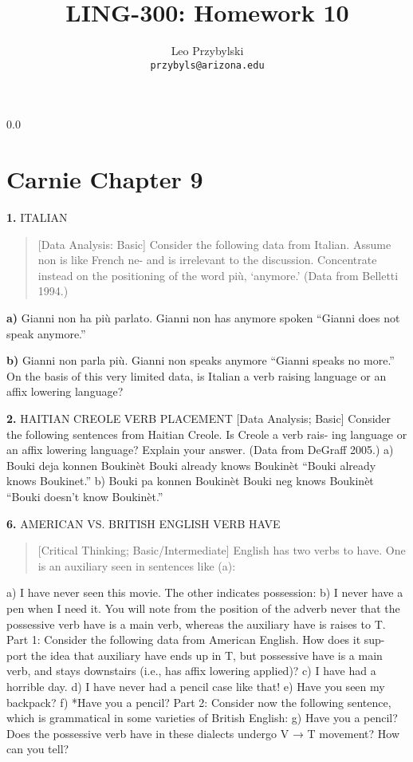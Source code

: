 \documentclass[11pt,notitlepage]{article}
\title{LING-300: Homework 10}
\author{Leo Przybylski\\
\texttt{przybyls@arizona.edu}}
\newcommand{\question}[2]{\textbf{#1.} #2}
\newcommand{\subquestion}[2]{\par\hspace{0.5cm} \textbf{#1)} #2}
\begin{document}
  \maketitle
  {\setlength{\baselineskip}%
           {0.0\baselineskip}
  \section*{Carnie Chapter 9}
  \hrulefill \par}

\question{1}{ITALIAN}
\begin{quote}
[Data Analysis: Basic]
Consider the following data from Italian. Assume non is like French
ne- and is irrelevant to the discussion. Concentrate instead on the
positioning of the word più, ‘anymore.’ (Data from Belletti 1994.)
\end{quote}
\subquestion{a}{Gianni non ha più parlato.}
Gianni non has anymore spoken “Gianni does not speak anymore.”

\subquestion{b}{Gianni non parla più.}
Gianni non speaks anymore “Gianni speaks no more.”
On the basis of this very limited data, is Italian a verb raising
language or an affix lowering language?

\question{2}{HAITIAN CREOLE VERB PLACEMENT}
[Data Analysis; Basic]
Consider the following sentences from Haitian Creole. Is Creole a verb rais- ing language or an affix lowering language? Explain your answer. (Data from DeGraff 2005.)
a) Bouki deja konnen Boukinèt Bouki already knows Boukinèt “Bouki already knows Boukinet.”
b) Bouki pa konnen Boukinèt Bouki neg knows Boukinèt “Bouki doesn’t
know Boukinèt.”

\question{6}{AMERICAN VS. BRITISH ENGLISH VERB HAVE}
\begin{quote}
[Critical Thinking; Basic/Intermediate]
English has two verbs to have. One is an auxiliary seen in sentences
like (a):
\end{quote}

a) I have never seen this movie.
The other indicates possession:
b) I never have a pen when I need it.
You will note from the position of the adverb never that the possessive verb have is a main verb, whereas the auxiliary have is raises to T.
Part 1: Consider the following data from American English. How does it sup- port the idea that auxiliary have ends up in T, but possessive have is a main verb, and stays downstairs (i.e., has affix lowering applied)?
c) I have had a horrible day.
d) I have never had a pencil case like that!
e) Have you seen my backpack?
f) *Have you a pencil?
Part 2: Consider now the following sentence, which is grammatical in some varieties of British English:
g) Have you a pencil?
Does the possessive verb have in these dialects undergo V → T
movement? How can you tell?
\end{document}
